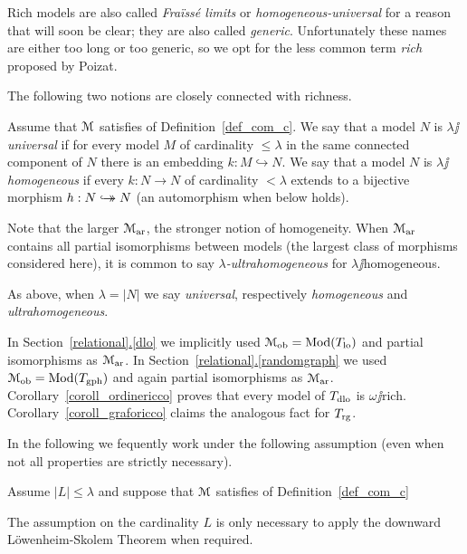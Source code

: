 \documentclass[creche.tex]{subfiles}
\begin{document}
Rich models are also called \textit{Fra\"iss\'e limits} or \textit{homogeneous-universal\/} for a reason that will soon be clear; they are also called \textit{generic}. Unfortunately these names are either too long or too generic, so we opt for the less common term \textit{rich\/} proposed by Poizat. 

The following two notions are closely connected with richness.

\begin{definition}\label{def_omogenea_universale}
Assume that $\EuScript M$ satisfies  of Definition~\ref{def_com_c}. We say that a model $N$ is \emph{$\lambda\jj$universal\/} if for every model $M$ of cardinality $\le\lambda$ in the same connected component of $N$ there is an embedding $k:M\hookrightarrow N$. We say that a model $N$ is \emph{$\lambda\jj$homogeneous\/} if every $k:N\to N$ of cardinality $<\lambda$ extends to a bijective morphism $h:N\hookrightarrow\mathrel{\mspace{-15mu}}\rightarrow N$ (an automorphism when  below holds).

Note that the larger $\EuScript M_{\rm ar}$, the stronger notion of homogeneity. When  $\EuScript M_{\rm ar}$ contains all partial isomorphisms between models (the largest class of morphisms considered here), it is common to say \emph{$\lambda$-ultra\-homo\-geneous\/} for $\lambda\jj$homogeneous. 

As above, when $\lambda=|N|$ we say \emph{universal}, respectively \emph{homogeneous} and \emph{ultrahomogeneous}.\QED
\end{definition}


In Section~\hyperref[dlo]{\ref*{relational}.\ref*{dlo}} we implicitly used $\EuScript M_{\rm ob}=\mathop{\rm Mod}(T_{\rm lo})$ and partial isomorphisms as $\EuScript M_{\rm ar}$. In Section~\hyperref[randomgraph]{\ref*{relational}.\ref*{randomgraph}} we used $\EuScript M_{\rm ob}=\mathop{\rm Mod}(T_{\rm gph})$ and again partial isomorphisms as $\EuScript M_{\rm ar}$. Corollary~\ref{coroll_ordinericco} proves that every model of $T_{\rm dlo}$ is $\omega\jj$rich.  Corollary~\ref{coroll_graforicco} claims the analogous fact for $T_{\rm rg}$.


In the following we fequently work under the following assumption (even when not all properties are strictly necessary).
 
\begin{assumption}\label{ass_c0-5}
Assume  $|L|\le\lambda$ and suppose that $\EuScript M$ satisfies  of Definition~\ref{def_com_c}
\end{assumption} 
 
The assumption on the cardinality $L$ is only necessary to apply the downward L\"owenheim-Skolem Theorem when required.
\end{document}
